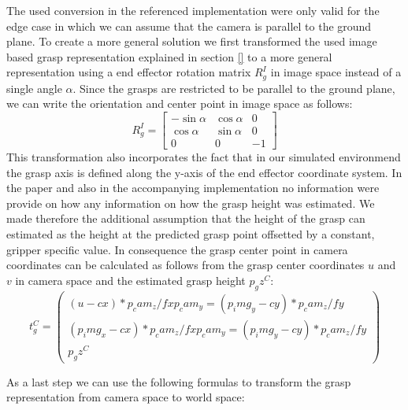 The used conversion in the referenced implementation were only valid for the edge case in which we can assume that the camera is parallel to the ground plane.
To create a more general solution we first transformed the used image based grasp representation explained in section \ref{} to a more general representation
using a end effector rotation matrix $R_g^I$ in image space instead of a single angle $\alpha$.
Since the grasps are restricted to be parallel to the ground plane, we can write the orientation and center point in image space as follows:
$$ R_g^I =  \begin{bmatrix}
        - \sin\alpha & \cos\alpha & 0  \\
        \cos\alpha   & \sin\alpha & 0  \\
        0            & 0          & -1
    \end{bmatrix}
$$
This transformation also incorporates the fact that in our simulated environmend the grasp axis is defined along the y-axis of the end effector coordinate system.
In the \cite{kumra2020antipodal} paper and also in the accompanying implementation no information were provide on how any information on how the grasp height was estimated.
We made therefore the additional assumption that the height of the grasp can estimated as the height at the predicted grasp point offsetted by a constant, gripper specific value.
In consequence the grasp center point in camera coordinates can be calculated as follows from the grasp center coordinates $u$ and $v$ in camera space and the estimated grasp height $p_gz^C$:
$$ t_g^C = \begin{pmatrix}
        (u - cx) * p_cam_z / fx
        p_cam_y = (p_img_y - cy) * p_cam_z / fy \\
        (p_img_x - cx) * p_cam_z / fx
        p_cam_y = (p_img_y - cy) * p_cam_z / fy \\
        p_gz^C
    \end{pmatrix} $$ %

As a last step we can use the following formulas to transform the grasp representation from camera space to world space:


